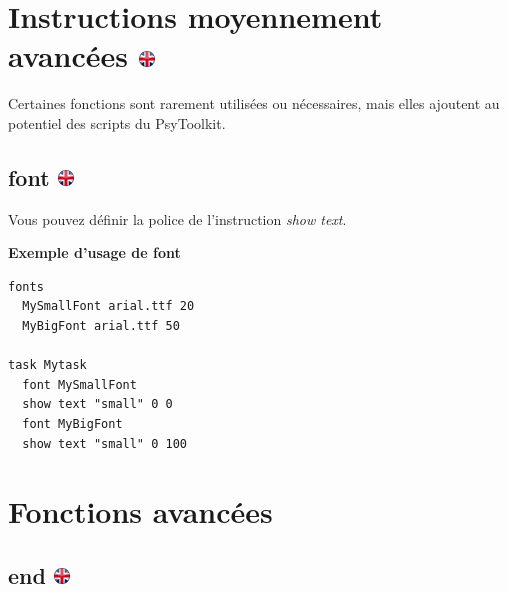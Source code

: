 \documentclass[
]{book}
\begin{document}
\hypertarget{instructions-moyennement-avancuxe9es}{%
\section[Instructions moyennement avancées
]{\texorpdfstring{Instructions moyennement avancées
\href{https://www.psytoolkit.org/doc3.2.0/syntax.html\#_less_often_used_instructions}{\protect\includegraphics{img/ukflag.png}}}{Instructions moyennement avancées }}\label{instructions-moyennement-avancuxe9es}}

Certaines fonctions sont rarement utilisées ou nécessaires, mais elles
ajoutent au potentiel des scripts du PsyToolkit.

\hypertarget{font}{%
\subsection[font ]{\texorpdfstring{font
\href{https://www.psytoolkit.org/doc3.2.0/syntax.html\#font}{\protect\includegraphics{img/ukflag.png}}}{font }}\label{font}}

Vous pouvez définir la police de l'instruction \emph{show text}.

\textbf{Exemple d'usage de font}

\begin{verbatim}
fonts
  MySmallFont arial.ttf 20
  MyBigFont arial.ttf 50

task Mytask
  font MySmallFont
  show text "small" 0 0
  font MyBigFont
  show text "small" 0 100
\end{verbatim}

\hypertarget{s5-10}{%
\section{Fonctions avancées}\label{s5-10}}

\hypertarget{end}{%
\subsection[end ]{\texorpdfstring{end
\href{https://www.psytoolkit.org/doc3.2.0/syntax.html\#task-end}{\protect\includegraphics{img/ukflag.png}}}{end }}\label{end}}
\end{document}
